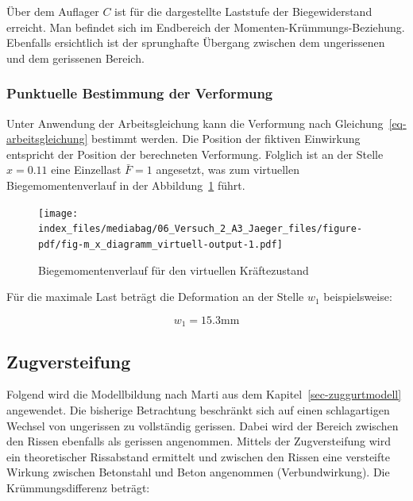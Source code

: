 \documentclass[
  12pt,
  letterpaper,
  egregdoesnotlikesansseriftitles]{scrreprt}
\begin{document}
Über dem Auflager \(C\) ist für die dargestellte Laststufe der
Biegewiderstand erreicht. Man befindet sich im Endbereich der
Momenten-Krümmungs-Beziehung. Ebenfalls ersichtlich ist der sprunghafte
Übergang zwischen dem ungerissenen und dem gerissenen Bereich.

\hypertarget{punktuelle-bestimmung-der-verformung}{%
\subsubsection{Punktuelle Bestimmung der
Verformung}\label{punktuelle-bestimmung-der-verformung}}

Unter Anwendung der Arbeitsgleichung kann die Verformung nach
Gleichung~\ref{eq-arbeitsgleichung} bestimmt werden. Die Position der
fiktiven Einwirkung entspricht der Position der berechneten Verformung.
Folglich ist an der Stelle \(x=0.11\) eine Einzellast \(\bar{F} = 1\)
angesetzt, was zum virtuellen Biegemomentenverlauf in der
Abbildung~\ref{fig-m_x_diagramm_virtuell} führt.

\begin{figure}[H]

{\centering \texttt{[image: index\_files/mediabag/06\_Versuch\_2\_A3\_Jaeger\_files/figure-pdf/fig-m\_x\_diagramm\_virtuell-output-1.pdf]}

}

\caption{\label{fig-m_x_diagramm_virtuell}Biegemomentenverlauf für den
virtuellen Kräftezustand}

\end{figure}

Für die maximale Last beträgt die Deformation an der Stelle \(w_1\)
beispielsweise:

\begin{equation}w_{1} = 15.3 \text{mm}\end{equation}

\hypertarget{zugversteifung}{%
\subsection{Zugversteifung}\label{zugversteifung}}

Folgend wird die Modellbildung nach Marti aus dem
Kapitel~\ref{sec-zuggurtmodell} angewendet. Die bisherige Betrachtung
beschränkt sich auf einen schlagartigen Wechsel von ungerissen zu
vollständig gerissen. Dabei wird der Bereich zwischen den Rissen
ebenfalls als gerissen angenommen. Mittels der Zugversteifung wird ein
theoretischer Rissabstand ermittelt und zwischen den Rissen eine
versteifte Wirkung zwischen Betonstahl und Beton angenommen
(Verbundwirkung). Die Krümmungsdifferenz beträgt:
\end{document}
